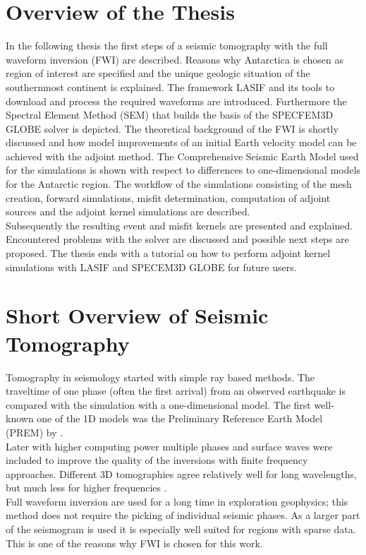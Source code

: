 \section{Overview of the Thesis}
In the following thesis the first steps of a seismic tomography with the full waveform inversion
(FWI) 
are described.
Reasons why Antarctica is chosen as region of interest are specified and the unique geologic 
situation of the southernmost continent is explained.
The framework LASIF and its tools to download and process the required 
waveforms are introduced.
Furthermore the Spectral Element Method (SEM) that builds the basis of the SPECFEM3D GLOBE 
solver is depicted.
The theoretical background of the FWI is shortly discussed and how model improvements 
of an initial Earth velocity model can be achieved with the adjoint method.
The Comprehensive Seismic Earth Model used for the simulations is shown with
respect to differences to one-dimensional models for the Antarctic region.
The workflow of the simulations consisting of the mesh creation, forward simulations, 
misfit determination, computation of adjoint sources and the adjoint kernel simulations
are described.\\
Subsequently the resulting event and misfit kernels are presented and explained.
Encountered problems with the solver are discussed and possible next steps are proposed.
The thesis ends with a tutorial on how to perform adjoint kernel simulations
with LASIF and SPECEM3D GLOBE for future users.


\section{Short Overview of Seismic Tomography}

Tomography in seismology started with simple ray based methods.
The traveltime of one phase (often the first arrival) from an observed earthquake
is compared with the simulation with a one-dimensional model.
The first well-known one of the 1D models was the Preliminary Reference Earth Model
(PREM) by \citealp{dziewonski1981preliminary}.\\
%
Later with higher computing power multiple phases and surface waves were included
to improve the quality of the inversions with finite frequency approaches.
Different 3D tomographies agree relatively well for long wavelengths, but much less
for higher frequencies \citep{Liu2012}. \\
%
Full waveform inversion are used for a long time in exploration geophysics;
this method does not require the picking of individual seismic phases.
As a larger part of the seismogram is used it is especially well suited
for regions with sparse data.
This is one of the reasons why FWI is chosen for this work.

